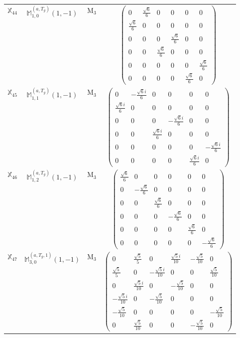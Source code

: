 \documentclass[fleqn,10pt,landscape]{article}
\begin{document}
\begin{itemize}
\begin{center}
\begin{longtable}{c|c|c|c}
$ \mathbb{X}_{44} $ & $\mathbb{M}_{1,0}^{(a,T_{g})}(1,-1)$ & M$_{3}$ & $\begin{pmatrix} 0 & \frac{\sqrt{6}}{6} & 0 & 0 & 0 & 0 \\ \frac{\sqrt{6}}{6} & 0 & 0 & 0 & 0 & 0 \\ 0 & 0 & 0 & \frac{\sqrt{6}}{6} & 0 & 0 \\ 0 & 0 & \frac{\sqrt{6}}{6} & 0 & 0 & 0 \\ 0 & 0 & 0 & 0 & 0 & \frac{\sqrt{6}}{6} \\ 0 & 0 & 0 & 0 & \frac{\sqrt{6}}{6} & 0 \end{pmatrix}$ \\
$ \mathbb{X}_{45} $ & $\mathbb{M}_{1,1}^{(a,T_{g})}(1,-1)$ & M$_{3}$ & $\begin{pmatrix} 0 & - \frac{\sqrt{6} i}{6} & 0 & 0 & 0 & 0 \\ \frac{\sqrt{6} i}{6} & 0 & 0 & 0 & 0 & 0 \\ 0 & 0 & 0 & - \frac{\sqrt{6} i}{6} & 0 & 0 \\ 0 & 0 & \frac{\sqrt{6} i}{6} & 0 & 0 & 0 \\ 0 & 0 & 0 & 0 & 0 & - \frac{\sqrt{6} i}{6} \\ 0 & 0 & 0 & 0 & \frac{\sqrt{6} i}{6} & 0 \end{pmatrix}$ \\
$ \mathbb{X}_{46} $ & $\mathbb{M}_{1,2}^{(a,T_{g})}(1,-1)$ & M$_{3}$ & $\begin{pmatrix} \frac{\sqrt{6}}{6} & 0 & 0 & 0 & 0 & 0 \\ 0 & - \frac{\sqrt{6}}{6} & 0 & 0 & 0 & 0 \\ 0 & 0 & \frac{\sqrt{6}}{6} & 0 & 0 & 0 \\ 0 & 0 & 0 & - \frac{\sqrt{6}}{6} & 0 & 0 \\ 0 & 0 & 0 & 0 & \frac{\sqrt{6}}{6} & 0 \\ 0 & 0 & 0 & 0 & 0 & - \frac{\sqrt{6}}{6} \end{pmatrix}$ \\
$ \mathbb{X}_{47} $ & $\mathbb{M}_{3,0}^{(a,T_{g},1)}(1,-1)$ & M$_{3}$ & $\begin{pmatrix} 0 & \frac{\sqrt{5}}{5} & 0 & \frac{\sqrt{5} i}{10} & - \frac{\sqrt{5}}{10} & 0 \\ \frac{\sqrt{5}}{5} & 0 & - \frac{\sqrt{5} i}{10} & 0 & 0 & \frac{\sqrt{5}}{10} \\ 0 & \frac{\sqrt{5} i}{10} & 0 & - \frac{\sqrt{5}}{10} & 0 & 0 \\ - \frac{\sqrt{5} i}{10} & 0 & - \frac{\sqrt{5}}{10} & 0 & 0 & 0 \\ - \frac{\sqrt{5}}{10} & 0 & 0 & 0 & 0 & - \frac{\sqrt{5}}{10} \\ 0 & \frac{\sqrt{5}}{10} & 0 & 0 & - \frac{\sqrt{5}}{10} & 0 \end{pmatrix}$ \\

\end{longtable}
\end{center}
\end{itemize}
\end{document}
